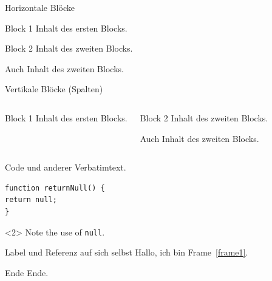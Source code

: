 \documentclass[t, aspectratio=169, ngerman]{beamer}
\begin{document}
	\begin{frame}{Horizontale Blöcke}
		\begin{block}{Block 1}
			Inhalt des ersten Blocks.
		\end{block}
		\begin{block}{Block 2}
			Inhalt des zweiten Blocks.

			Auch Inhalt des zweiten Blocks.
		\end{block}
	\end{frame}

	\begin{frame}{Vertikale Blöcke (Spalten)}
		\begin{columns}
				\begin{block}{Block 1}
					Inhalt des ersten Blocks.
				\end{block}
				\begin{block}{Block 2}
					Inhalt des zweiten Blocks.

					Auch Inhalt des zweiten Blocks.
				\end{block}
		\end{columns}
	\end{frame}

\begin{frame}[fragile]{Code und anderer Verbatimtext.}
\begin{verbatim}
function returnNull() {
return null;
}
\end{verbatim}
\begin{uncoverenv}<2>
Note the use of \verb|null|.
\end{uncoverenv}
\end{frame}

	\begin{frame}[label=frame1]{Label und Referenz auf sich selbst}
		Hallo, ich bin Frame~\autoref{frame1}.
	\end{frame}

	\begin{frame}[plain]{Ende}
		\Huge{Ende.}
	\end{frame}
\end{document}
